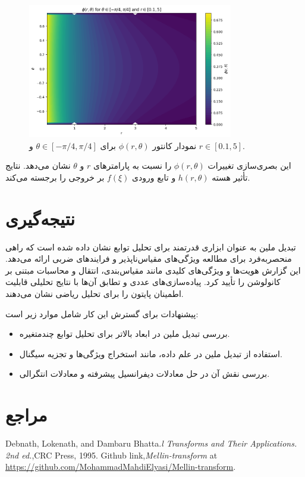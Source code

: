 \documentclass[12pt,a4paper]{article}
\begin{document}
\begin{figure}[H]
    \centering
    \includegraphics[width=0.8\textwidth]{Phi.png}
    \caption{نمودار کانتور $\phi(r, \theta)$ برای $\theta \in [-\pi/4, \pi/4]$ و $r \in [0.1, 5]$.}
    \label{fig:phi_contour}
\end{figure}

این بصری‌سازی تغییرات $\phi(r, \theta)$ را نسبت به پارامترهای $r$ و $\theta$ نشان می‌دهد. نتایج تأثیر هسته $h(r, \theta)$ و تابع ورودی $f(\xi)$ بر خروجی را برجسته می‌کند.

\section{نتیجه‌گیری}
تبدیل ملین به عنوان ابزاری قدرتمند برای تحلیل توابع نشان داده شده است که راهی منحصربه‌فرد برای مطالعه ویژگی‌های مقیاس‌ناپذیر و فرایندهای ضربی ارائه می‌دهد. این گزارش هویت‌ها و ویژگی‌های کلیدی مانند مقیاس‌بندی، انتقال و محاسبات مبتنی بر کانولوشن را تأیید کرد. پیاده‌سازی‌های عددی و تطابق آن‌ها با نتایج تحلیلی قابلیت اطمینان پایتون را برای تحلیل ریاضی نشان می‌دهند.

پیشنهادات برای گسترش این کار شامل موارد زیر است:
\begin{itemize}
    \item بررسی تبدیل ملین در ابعاد بالاتر برای تحلیل توابع چندمتغیره.
    \item استفاده از تبدیل ملین در علم داده، مانند استخراج ویژگی‌ها و تجزیه سیگنال.
    \item بررسی نقش آن در حل معادلات دیفرانسیل پیشرفته و معادلات انتگرالی.
\end{itemize}
\newpage

\clearpage

\section{مراجع}

\begin{thebibliography}{99}
     Debnath, Lokenath, and Dambaru Bhatta.\textit{l Transforms and Their Applications. 2nd ed.},CRC Press, 1995.
     Github link,\textit{Mellin-transform} at \url{https://github.com/MohammadMahdiElyasi/Mellin-transform}.

\end{thebibliography}
\end{document}
